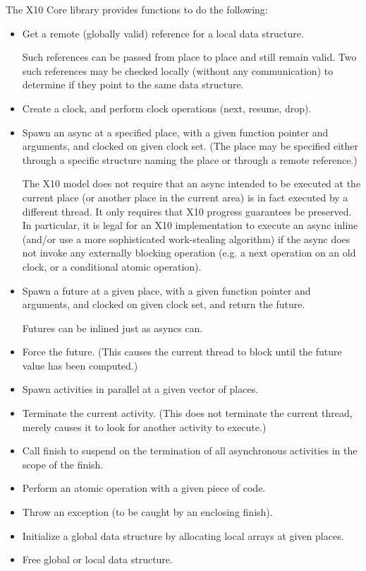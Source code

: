 \documentclass{article}
\begin{document}
The X10 Core library provides functions to do the following:

\begin{itemize}
\item Get a remote (globally valid) reference for a local data structure.

  Such references can be passed from place to place and still remain
  valid. Two such references may be checked locally (without any
  communication) to determine if they point to the same data structure.

\item Create a clock, and perform clock operations (next, resume, drop).

\item Spawn an async at a specified place, with a given function pointer
  and arguments, and clocked on given clock set. (The place may be
  specified either through a specific structure naming the place or
  through a remote reference.)

  The X10 model does not require that an async intended to be executed
  at the current place (or another place in the current area) is in
  fact executed by a different thread. It only requires that X10
  progress guarantees be preserved. In particular, it is legal for an
  X10 implementation to execute an async inline (and/or use a more
  sophisticated work-stealing algorithm) if the async does not invoke
  any externally blocking operation (e.g. a next operation on an old
  clock, or a conditional atomic operation).

\item Spawn a future at a given place, with a given function
  pointer and arguments, and clocked on given clock set, and return
  the future.

  Futures can be inlined just as asyncs can.

\item Force the future. (This causes the current thread to block until the
  future value has been computed.)

\item Spawn activities in parallel at a given vector of places.

\item Terminate the current activity. (This does not terminate the current
  thread, merely causes it to look for another activity to execute.)

\item Call finish to suspend on the termination of all asynchronous
  activities in the scope of the finish.

\item Perform an atomic operation with a given piece of code.
\item Throw an exception (to be caught by an enclosing finish).

\item Initialize a global data structure by allocating local arrays at
  given places.

\item Free global or local data structure.
\end{itemize}
\end{document}

